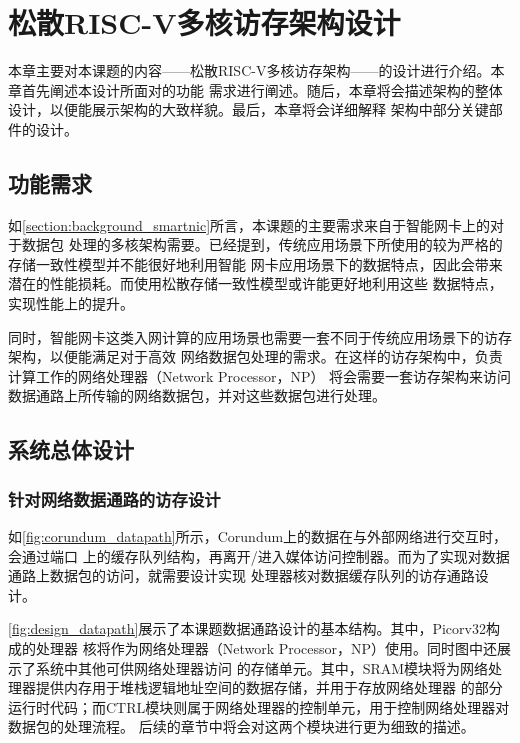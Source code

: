 \section{松散RISC-V多核访存架构设计}

本章主要对本课题的内容——松散RISC-V多核访存架构——的设计进行介绍。本章首先阐述本设计所面对的功能
需求进行阐述。随后，本章将会描述架构的整体设计，以便能展示架构的大致样貌。最后，本章将会详细解释
架构中部分关键部件的设计。

\subsection{功能需求}
\label{section:design_need}

如\autoref{section:background_smartnic}所言，本课题的主要需求来自于智能网卡上的对于数据包
处理的多核架构需要。已经提到，传统应用场景下所使用的较为严格的存储一致性模型并不能很好地利用智能
网卡应用场景下的数据特点，因此会带来潜在的性能损耗。而使用松散存储一致性模型或许能更好地利用这些
数据特点，实现性能上的提升。

同时，智能网卡这类入网计算的应用场景也需要一套不同于传统应用场景下的访存架构，以便能满足对于高效
网络数据包处理的需求。在这样的访存架构中，负责计算工作的网络处理器（Network Processor，NP）
将会需要一套访存架构来访问数据通路上所传输的网络数据包，并对这些数据包进行处理。

\subsection{系统总体设计}
\label{section:design_overview}

\subsubsection{针对网络数据通路的访存设计}

如\autoref{fig:corundum_datapath}所示，Corundum上的数据在与外部网络进行交互时，会通过端口
上的缓存队列结构，再离开/进入媒体访问控制器。而为了实现对数据通路上数据包的访问，就需要设计实现
处理器核对数据缓存队列的访存通路设计。


\autoref{fig:design_datapath}展示了本课题数据通路设计的基本结构。其中，Picorv32构成的处理器
核将作为网络处理器（Network Processor，NP）使用。同时图中还展示了系统中其他可供网络处理器访问
的存储单元。其中，SRAM模块将为网络处理器提供内存用于堆栈逻辑地址空间的数据存储，并用于存放网络处理器
的部分运行时代码；而CTRL模块则属于网络处理器的控制单元，用于控制网络处理器对数据包的处理流程。
后续的章节中将会对这两个模块进行更为细致的描述。

